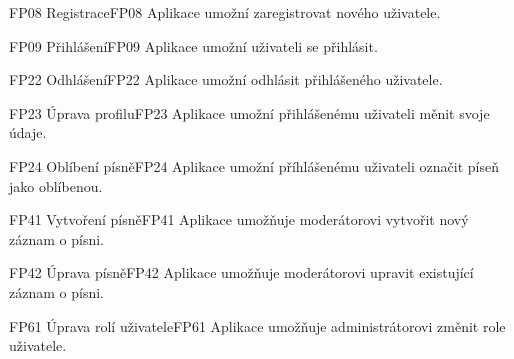 \begin{requirment}{FP08 Registrace}{FP08}
    Aplikace umožní zaregistrovat nového uživatele.
\end{requirment}

\begin{requirment}{FP09 Přihlášení}{FP09}
    Aplikace umožní uživateli se přihlásit.
\end{requirment}

\begin{requirment}{FP22 Odhlášení}{FP22}
    Aplikace umožní odhlásit přihlášeného uživatele.
\end{requirment}

\begin{requirment}{FP23 Úprava profilu}{FP23}
    Aplikace umožní přihlášenému uživateli měnit svoje údaje.
\end{requirment}


\begin{requirment}{FP24 Oblíbení písně}{FP24}
    Aplikace umožní příhlášenému uživateli označit píseň jako oblíbenou.
\end{requirment}

\begin{requirment}{FP41 Vytvoření písně}{FP41}
    Aplikace umožňuje moderátorovi vytvořit nový záznam o písni.
\end{requirment}

\begin{requirment}{FP42 Úprava písně}{FP42}
    Aplikace umožňuje moderátorovi upravit existující záznam o písni.
\end{requirment}

\begin{requirment}{FP61 Úprava rolí uživatele}{FP61}
    Aplikace umožňuje administrátorovi změnit role uživatele.
\end{requirment}
